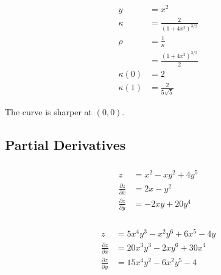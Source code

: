 \documentclass{article}
\begin{document}
\setcounter{subsubsection}{22}
\subsubsection{}

\begin{align*}
  y         & = x^2                           \\
  \kappa    & = \frac{2}{(1 + 4 x^2)^{3 / 2}} \\
  \rho      & = \frac{1}{\kappa}              \\
            & = \frac{(1 + 4 x^2)^{3 / 2}}{2} \\
  \kappa(0) & = 2                             \\
  \kappa(1) & = \frac{2}{5 \sqrt{5}}
\end{align*}

The curve is sharper at $(0, 0)$.

\subsection{Partial Derivatives}

\setcounter{subsubsection}{12}
\subsubsection{}

\begin{align*}
  z                             & = x^2 - x y^2 + 4 y^5 \\
  \frac{\partial z}{\partial x} & = 2 x - y^2           \\
  \frac{\partial z}{\partial y} & = -2 x y + 20 y^4
\end{align*}

\setcounter{subsubsection}{14}
\subsubsection{}

\begin{align*}
  z                             & = 5 x^4 y^3 - x^2 y^6 + 6 x^5 - 4 y \\
  \frac{\partial z}{\partial x} & = 20 x^3 y^3 - 2 x y^6 + 30 x^4     \\
  \frac{\partial z}{\partial y} & = 15 x^4 y^2 - 6 x^2 y^5 - 4
\end{align*}

\setcounter{subsubsection}{32}
\subsubsection{}
\end{document}
